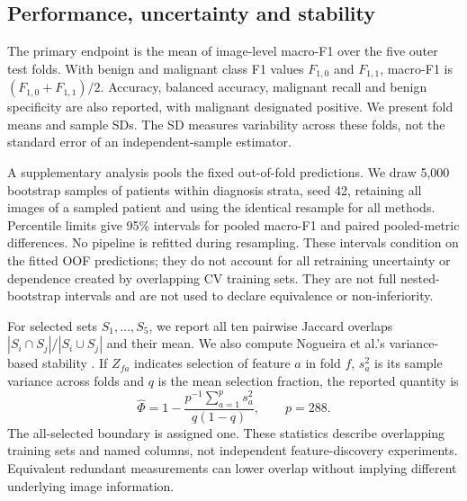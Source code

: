 \documentclass[11pt,a4paper]{article}
\begin{document}
\subsection{Performance, uncertainty and stability}
The primary endpoint is the mean of image-level macro-F1 over the five outer test folds. With benign and malignant class F1 values $F_{1,0}$ and $F_{1,1}$, macro-F1 is $(F_{1,0}+F_{1,1})/2$. Accuracy, balanced accuracy, malignant recall and benign specificity are also reported, with malignant designated positive. We present fold means and sample SDs. The SD measures variability across these folds, not the standard error of an independent-sample estimator.

A supplementary analysis pools the fixed out-of-fold predictions. We draw 5,000 bootstrap samples of patients within diagnosis strata, seed 42, retaining all images of a sampled patient and using the identical resample for all methods. Percentile limits give 95\% intervals for pooled macro-F1 and paired pooled-metric differences. No pipeline is refitted during resampling. These intervals condition on the fitted OOF predictions; they do not account for all retraining uncertainty or dependence created by overlapping CV training sets. They are not full nested-bootstrap intervals and are not used to declare equivalence or non-inferiority.

For selected sets $S_1,\ldots,S_5$, we report all ten pairwise Jaccard overlaps $|S_i\cap S_j|/|S_i\cup S_j|$ and their mean. We also compute Nogueira et al.'s variance-based stability \cite{nogueira}. If $Z_{fa}$ indicates selection of feature $a$ in fold $f$, $s_a^2$ is its sample variance across folds and $q$ is the mean selection fraction, the reported quantity is
\begin{equation}
 \widehat{\Phi}=1-\frac{p^{-1}\sum_{a=1}^{p}s_a^2}{q(1-q)},\qquad p=288.
\end{equation}
The all-selected boundary is assigned one. These statistics describe overlapping training sets and named columns, not independent feature-discovery experiments. Equivalent redundant measurements can lower overlap without implying different underlying image information.
\end{document}
